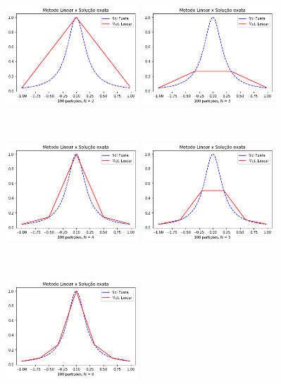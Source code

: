 \documentclass{article}
\begin{document}
\begin{figure}[!htb]
\centering
\includegraphics [width=5cm,height=5cm]{LSEc2.png}
\includegraphics [width=5cm,height=5cm]{LSEc3.png}
\includegraphics [width=5cm,height=5cm]{LSEc4.png}
\includegraphics [width=5cm,height=5cm]{LSEc5.png}
\includegraphics [width=5cm,height=5cm]{LSEc6.png}

\end{figure}
\end{document}
